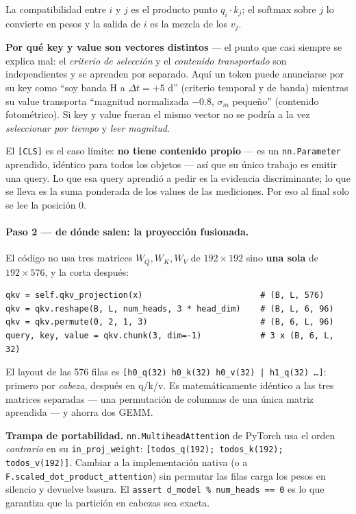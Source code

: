 \documentclass[11pt,a4paper]{article}
\newcommand{\code}[1]{\texttt{\small #1}}
\newlength{\examenpad}
\newenvironment{examen}
  {\par\medskip\noindent
   \begin{lrbox}{\examenbox}%
   \begin{minipage}{\dimexpr\linewidth-2\examenpad}\small}
  {\end{minipage}%
   \end{lrbox}%
   {\setlength{\fboxsep}{\examenpad}\colorbox{boxgray}{\usebox{\examenbox}}}%
   \par\medskip}
\begin{document}
La compatibilidad entre $i$ y $j$ es el producto punto $q_i\cdot k_j$; el softmax sobre $j$ lo
convierte en pesos y la salida de $i$ es la mezcla de los $v_j$.

\textbf{Por qué key y value son vectores distintos} --- el punto que casi siempre se explica mal:
el \emph{criterio de selección} y el \emph{contenido transportado} son independientes y se aprenden
por separado. Aquí un token puede anunciarse por su key como ``soy banda H a $\Delta t = +5$ d''
(criterio temporal y de banda) mientras su value transporta ``magnitud normalizada $-0.8$, $\sigma_m$
pequeño'' (contenido fotométrico). Si key y value fueran el mismo vector no se podría a la vez
\emph{seleccionar por tiempo} y \emph{leer magnitud}.

El \code{[CLS]} es el caso límite: \textbf{no tiene contenido propio} --- es un \code{nn.Parameter}
aprendido, idéntico para todos los objetos --- así que su único trabajo es emitir una query. Lo que
esa query aprendió a pedir es la evidencia discriminante; lo que se lleva es la suma ponderada de los
values de las mediciones. Por eso al final solo se lee la posición 0.

\paragraph{Paso 2 --- de dónde salen: la proyección fusionada.} El código no usa tres matrices
$W_Q,W_K,W_V$ de $192\times192$ sino \textbf{una sola} de $192\times576$, y la corta después:

\begin{center}
\begin{minipage}{0.94\linewidth}
\small
\begin{verbatim}
qkv = self.qkv_projection(x)                        # (B, L, 576)
qkv = qkv.reshape(B, L, num_heads, 3 * head_dim)    # (B, L, 6, 96)
qkv = qkv.permute(0, 2, 1, 3)                       # (B, 6, L, 96)
query, key, value = qkv.chunk(3, dim=-1)            # 3 x (B, 6, L, 32)
\end{verbatim}
\end{minipage}
\end{center}

\noindent El layout de las 576 filas es
\code{[h0\_q(32) h0\_k(32) h0\_v(32) | h1\_q(32) \dots]}: primero por \emph{cabeza}, después en
q/k/v. Es matemáticamente idéntico a las tres matrices separadas --- una permutación de columnas de
una única matriz aprendida --- y ahorra dos GEMM.

\begin{examen}
\textbf{Trampa de portabilidad.} \code{nn.MultiheadAttention} de PyTorch usa el orden \emph{contrario}
en su \code{in\_proj\_weight}: \code{[todos\_q(192); todos\_k(192); todos\_v(192)]}. Cambiar a la
implementación nativa (o a \code{F.scaled\_dot\_product\_attention}) sin permutar las filas carga los
pesos en silencio y devuelve basura. El \code{assert d\_model \% num\_heads == 0} es lo que garantiza
que la partición en cabezas sea exacta.
\end{examen}
\end{document}
